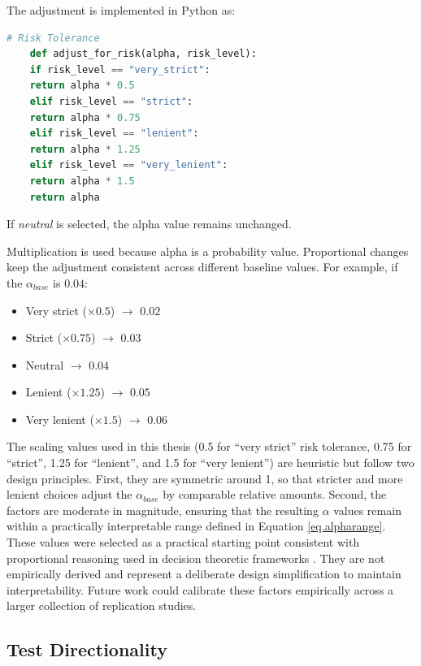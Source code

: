 {The adjustment is implemented in Python as:
\begin{lstlisting}[language=Python]
	# Risk Tolerance
	def adjust_for_risk(alpha, risk_level):
	if risk_level == "very_strict":
	return alpha * 0.5
	elif risk_level == "strict":
	return alpha * 0.75
	elif risk_level == "lenient":
	return alpha * 1.25
	elif risk_level == "very_lenient":
	return alpha * 1.5
	return alpha
\end{lstlisting}

If \textit{neutral} is selected, the alpha value remains unchanged.

Multiplication is used because alpha is a probability value. Proportional changes keep the adjustment consistent across different baseline values. For example, if the $\alpha_{base}$ is $0.04$:

\begin{itemize}
	\item Very strict ($\times 0.5$) $\rightarrow$ $0.02$
	\item Strict ($\times 0.75$) $\rightarrow$ $0.03$
	\item Neutral $\rightarrow$ $0.04$
	\item Lenient ($\times 1.25$) $\rightarrow$ $0.05$
	\item Very lenient ($\times 1.5$) $\rightarrow$ $0.06$
\end{itemize}

The scaling values used in this thesis (0.5 for ``very strict'' risk tolerance, 
0.75 for ``strict'', 1.25 for ``lenient'', and 1.5 for ``very lenient'') are 
heuristic but follow two design principles. First, they are symmetric around 
1, so that stricter and more lenient choices adjust the $\alpha_{base}$ by comparable relative amounts. Second, the factors are moderate in 
magnitude, ensuring that the resulting $\alpha$ values remain within a 
practically interpretable range defined in Equation \ref{eq.alpharange}.  These values were selected as a practical starting point consistent with proportional reasoning used in decision theoretic frameworks \cite{Berger1985}. They are not empirically derived and represent a deliberate design simplification to maintain interpretability. Future work could calibrate these factors empirically across a larger collection of replication studies.

\subsection{Test Directionality}

}
